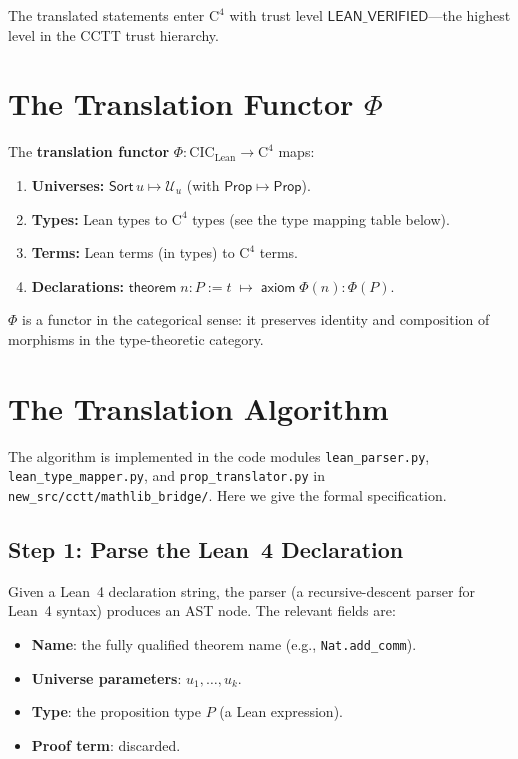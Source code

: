 The translated statements enter $\mathrm{C}^4$ with trust level
$\mathsf{LEAN\_VERIFIED}$---the highest level in the CCTT trust
hierarchy.


\section{The Translation Functor $\Phi$}
\label{sec:translation-functor}

\begin{definition}
\label{def:translation-functor}
The \textbf{translation functor} $\Phi : \mathrm{CIC}_{\mathrm{Lean}}
\to \mathrm{C}^4$ maps:
\begin{enumerate}
\item \textbf{Universes:} $\mathsf{Sort}\, u \mapsto \mathcal{U}_u$
  (with $\mathsf{Prop} \mapsto \mathsf{Prop}$).
\item \textbf{Types:} Lean types to $\mathrm{C}^4$ types (see the
  type mapping table below).
\item \textbf{Terms:} Lean terms (in types) to $\mathrm{C}^4$ terms.
\item \textbf{Declarations:}
  $\mathsf{theorem}\; n : P := t \;\mapsto\;
  \mathsf{axiom}\; \Phi(n) : \Phi(P)$.
\end{enumerate}
$\Phi$ is a functor in the categorical sense: it preserves identity
and composition of morphisms in the type-theoretic category.
\end{definition}


\section{The Translation Algorithm}
\label{sec:translation-algorithm}

The algorithm is implemented in the code modules
\texttt{lean\_parser.py}, \texttt{lean\_type\_mapper.py}, and
\texttt{prop\_translator.py} in \texttt{new\_src/cctt/mathlib\_bridge/}.
Here we give the formal specification.

\subsection{Step 1: Parse the Lean~4 Declaration}

Given a Lean~4 declaration string, the parser (a recursive-descent
parser for Lean~4 syntax) produces an AST node.  The relevant fields are:
\begin{itemize}
\item \textbf{Name}: the fully qualified theorem name (e.g.,
  \texttt{Nat.add\_comm}).
\item \textbf{Universe parameters}: $u_1, \ldots, u_k$.
\item \textbf{Type}: the proposition type $P$ (a Lean expression).
\item \textbf{Proof term}: discarded.
\end{itemize}

